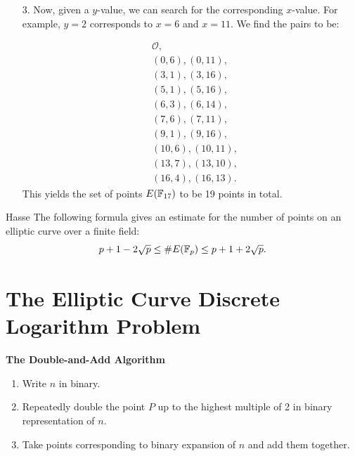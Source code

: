 {    \begin{enumerate}
        \item[3.] Now, given a \(y\)-value, we can search for the corresponding \(x\)-value. For example, \(y = 2\) corresponds to \(x = 6\) and \(x = 11\). We find the pairs to be:

              \[
                  \begin{aligned}
                       & \mathcal{O},       \\
                       & (0, 6), (0, 11),   \\
                       & (3, 1), (3, 16),   \\
                       & (5, 1), (5, 16),   \\
                       & (6, 3), (6, 14),   \\
                       & (7, 6), (7, 11),   \\
                       & (9, 1), (9, 16),   \\
                       & (10, 6), (10, 11), \\
                       & (13, 7), (13, 10), \\
                       & (16, 4), (16, 13).
                  \end{aligned}
              \]
              This yields the set of points \(E(\mathbb{F}_{17})\) to be 19 points in total.
    \end{enumerate}
}

\begin{theorem}
    {Hasse} The following formula gives an estimate for the number of points on an elliptic curve over a finite field:
    \[
        p + 1 - 2\sqrt{p} \le \#E(\mathbb{F}_{p}) \le p + 1 + 2\sqrt{p}.
    \]
\end{theorem}

\section{The Elliptic Curve Discrete Logarithm Problem}


\begin{center}
\textbf{The Double-and-Add Algorithm}
\end{center}

\begin{enumerate}
    \item Write \(n\) in binary.
    \item Repeatedly double the point \(P\) up to the highest multiple of 2 in binary representation of \(n\).
    \item Take points corresponding to binary expansion of \(n\) and add them together.
\end{enumerate}

